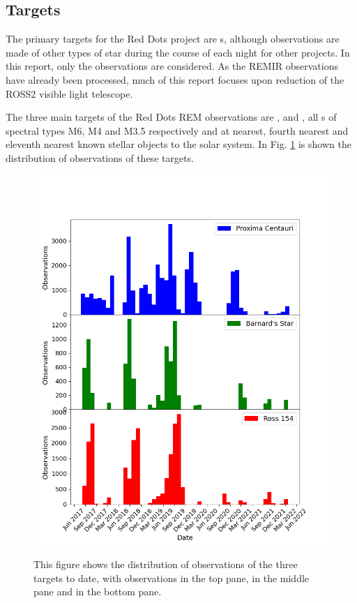 \subsection{Targets}

The primary targets for the Red Dots project are \rdwarf s, although
observations are made of other types of star during the course of each night
for other projects. In this report, only the {\rdwarf} observations are
considered. As the REMIR observations have already been processed, much of this report
focuses upon reduction of the ROSS2 visible light telescope.

The three main targets of the Red Dots REM observations are \prox, {\bstar} and
\ross, all \rdwarf s of spectral types M6, M4 and M3.5 respectively and at
nearest, fourth nearest and eleventh nearest known stellar objects to the solar
system. In Fig. \ref{fig:rdwarfhist} is shown the distribution of observations
of these targets.

\begin{figure}[!htbp]
\begin{center}
\includegraphics[scale=0.60]{images/rdwarfhist.png} \\
\end{center}   
\caption{This figure shows the distribution of observations of the three
{\rdwarf} targets to date, with {\prox} observations in the top pane, {\bstar}
in the middle pane and {\ross} in the bottom pane.}
\protect\label{fig:rdwarfhist}
\end{figure}

